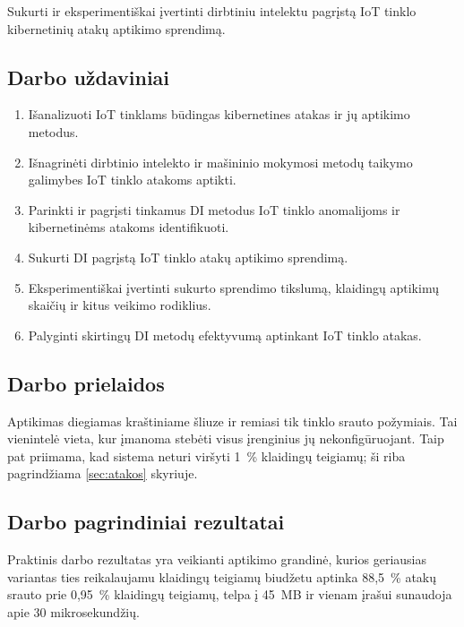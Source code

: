 Sukurti ir eksperimentiškai įvertinti dirbtiniu intelektu pagrįstą IoT
tinklo kibernetinių atakų aptikimo sprendimą.

\subsection*{Darbo uždaviniai}

\begin{enumerate}
  \item Išanalizuoti IoT tinklams būdingas kibernetines atakas ir jų aptikimo metodus.
  \item Išnagrinėti dirbtinio intelekto ir mašininio mokymosi metodų taikymo
        galimybes IoT tinklo atakoms aptikti.
  \item Parinkti ir pagrįsti tinkamus DI metodus IoT tinklo anomalijoms ir
        kibernetinėms atakoms identifikuoti.
  \item Sukurti DI pagrįstą IoT tinklo atakų aptikimo sprendimą.
  \item Eksperimentiškai įvertinti sukurto sprendimo tikslumą, klaidingų
        aptikimų skaičių ir kitus veikimo rodiklius.
  \item Palyginti skirtingų DI metodų efektyvumą aptinkant IoT tinklo atakas.
\end{enumerate}

\subsection*{Darbo prielaidos}

Aptikimas diegiamas kraštiniame šliuze ir remiasi tik tinklo
srauto požymiais. Tai vienintelė vieta, kur įmanoma stebėti visus
įrenginius jų nekonfigūruojant. Taip pat priimama, kad sistema neturi viršyti
1~\% klaidingų teigiamų; ši riba pagrindžiama \ref{sec:atakos}
skyriuje.

\subsection*{Darbo pagrindiniai rezultatai}

Praktinis darbo rezultatas yra veikianti aptikimo grandinė, kurios
geriausias variantas ties reikalaujamu klaidingų teigiamų biudžetu
aptinka 88,5~\% atakų srauto prie
0,95~\% klaidingų teigiamų, telpa į 45~MB ir
vienam įrašui sunaudoja apie 30 mikrosekundžių.
